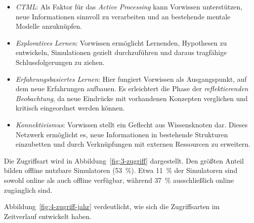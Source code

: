 \begin{itemize}
    \item \textit{\ac{CTML}}: Als Faktor für das \textit{Active Processing} kann Vorwissen unterstützen, neue Informationen sinnvoll zu verarbeiten und an bestehende mentale Modelle anzuknüpfen.
    \item \textit{Exploratives Lernen}: Vorwissen ermöglicht Lernenden, Hypothesen zu entwickeln, Simulationen gezielt durchzuführen und daraus tragfähige Schlussfolgerungen zu ziehen.
    \item \textit{Erfahrungsbasiertes Lernen}: Hier fungiert Vorwissen als Ausgangspunkt, auf dem neue Erfahrungen aufbauen. Es erleichtert die Phase der \textit{reflektierenden Beobachtung}, da neue Eindrücke mit vorhandenen Konzepten verglichen und kritisch eingeordnet werden können.
    \item \textit{Konnektivismus}: Vorwissen stellt ein Geflecht aus Wissensknoten dar. Dieses Netzwerk ermöglicht es, neue Informationen in bestehende Strukturen einzubetten und durch Verknüpfungen mit externen Ressourcen zu erweitern.
\end{itemize}

 Die Zugriffsart wird in Abbildung~\ref{fig:3-zugriff} dargestellt. Den größten Anteil bilden offline nutzbare Simulatoren (53~\%). Etwa 11~\% der Simulatoren sind sowohl online als auch offline verfügbar, während 37~\% ausschließlich online zugänglich sind.

Abbildung~\ref{fig:4-zugriff-jahr} verdeutlicht, wie sich die Zugriffsarten im Zeitverlauf entwickelt haben.

